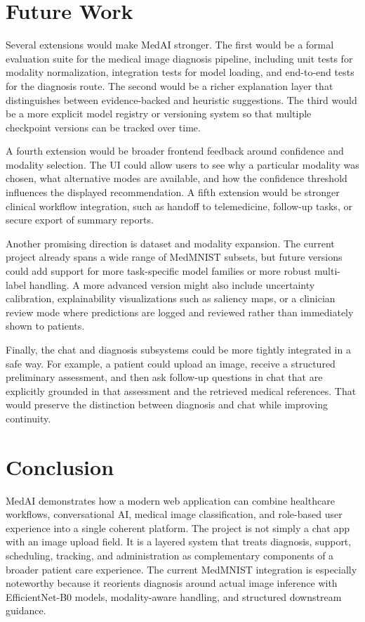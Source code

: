 \documentclass[conference]{IEEEtran}
\begin{document}
\section{Future Work}
Several extensions would make MedAI stronger. The first would be a formal evaluation suite for the medical image diagnosis pipeline, including unit tests for modality normalization, integration tests for model loading, and end-to-end tests for the diagnosis route. The second would be a richer explanation layer that distinguishes between evidence-backed and heuristic suggestions. The third would be a more explicit model registry or versioning system so that multiple checkpoint versions can be tracked over time.

A fourth extension would be broader frontend feedback around confidence and modality selection. The UI could allow users to see why a particular modality was chosen, what alternative modes are available, and how the confidence threshold influences the displayed recommendation. A fifth extension would be stronger clinical workflow integration, such as handoff to telemedicine, follow-up tasks, or secure export of summary reports.

Another promising direction is dataset and modality expansion. The current project already spans a wide range of MedMNIST subsets, but future versions could add support for more task-specific model families or more robust multi-label handling. A more advanced version might also include uncertainty calibration, explainability visualizations such as saliency maps, or a clinician review mode where predictions are logged and reviewed rather than immediately shown to patients.

Finally, the chat and diagnosis subsystems could be more tightly integrated in a safe way. For example, a patient could upload an image, receive a structured preliminary assessment, and then ask follow-up questions in chat that are explicitly grounded in that assessment and the retrieved medical references. That would preserve the distinction between diagnosis and chat while improving continuity.

\section{Conclusion}
MedAI demonstrates how a modern web application can combine healthcare workflows, conversational AI, medical image classification, and role-based user experience into a single coherent platform. The project is not simply a chat app with an image upload field. It is a layered system that treats diagnosis, support, scheduling, tracking, and administration as complementary components of a broader patient care experience. The current MedMNIST integration is especially noteworthy because it reorients diagnosis around actual image inference with EfficientNet-B0 models, modality-aware handling, and structured downstream guidance.
\end{document}
